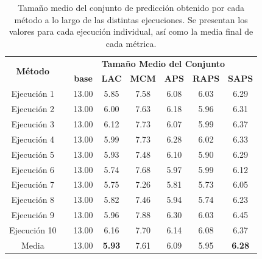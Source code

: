 \begin{table}[h]
    \centering
    \small
    \begin{tabular}{cccccccc}
    \toprule
    \multirow{2}{*}{\textbf{Método}} &  & \multicolumn{6}{c}{\textbf{Tamaño Medio del Conjunto}} \\ \cline{3-8} 
    &  & \textbf{base} & \textbf{LAC} & \textbf{MCM} & \textbf{APS} & \textbf{RAPS} & \textbf{SAPS} \\ \cline{1-1} \cline{3-8} 
    Ejecución 1 &  & 13.00 & 5.85 & 7.58 & 6.08 & 6.03 & 6.29 \\
    Ejecución 2 &  & 13.00 & 6.00 & 7.63 & 6.18 & 5.96 & 6.31 \\
    Ejecución 3 &  & 13.00 & 6.12 & 7.73 & 6.07 & 5.99 & 6.37 \\
    Ejecución 4 &  & 13.00 & 5.99 & 7.73 & 6.28 & 6.02 & 6.33 \\
    Ejecución 5 &  & 13.00 & 5.93 & 7.48 & 6.10 & 5.90 & 6.29 \\
    Ejecución 6 &  & 13.00 & 5.74 & 7.68 & 5.97 & 5.99 & 6.12 \\
    Ejecución 7 &  & 13.00 & 5.75 & 7.26 & 5.81 & 5.73 & 6.05 \\
    Ejecución 8 &  & 13.00 & 5.82 & 7.46 & 5.94 & 5.74 & 6.23 \\
    Ejecución 9 &  & 13.00 & 5.96 & 7.88 & 6.30 & 6.03 & 6.45 \\
    Ejecución 10 &  & 13.00 & 6.16 & 7.70 & 6.14 & 6.08 & 6.37 \\ \cline{1-1} \cline{3-8} 
    Media &  & 13.00 & \textbf{5.93} & 7.61 & 6.09 & 5.95 & \textbf{6.28} \\ 
    \bottomrule
    \end{tabular}
    \caption[
        Problema de clasificación de edad: 
        Tamaño medio del conjunto de predicción obtenido por cada método a lo largo de las distintas ejecuciones.
    ]{
        Tamaño medio del conjunto de predicción obtenido por cada método a lo largo de las distintas ejecuciones. 
        Se presentan los valores para cada ejecución individual, así como la media final de cada métrica.
    }
    \label{tab:AGC_MPSS_comparative}
\end{table}


